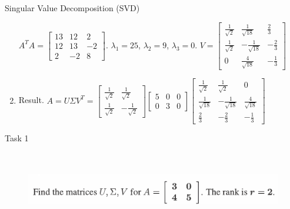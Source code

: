 \documentclass[aspectratio=169]{beamer}
\begin{document}
\begin{frame}[t]{Singular Value Decomposition (SVD)}
\begin{enumerate}
        $A^TA= \begin{bmatrix}
        13 & 12 & 2 \\
        12 & 13 & -2 \\ 
        2 & -2  & 8 
        \end{bmatrix}$. $\lambda_1 = 25$, $\lambda_2 = 9$, $\lambda_3 = 0$. $V = \begin{bmatrix}
            \frac{1}{\sqrt{2}} & \frac{1}{\sqrt{18}} & \frac{2}{3} \\
            \frac{1}{\sqrt{2}} & -\frac{1}{\sqrt{18}} & -\frac{2}{3}\\ 
            0 & \frac{4}{\sqrt{18}} & -\frac{1}{3}  
        \end{bmatrix}$
    \item Result. $A=U\Sigma V^T=\begin{bmatrix}
        \frac{1}{\sqrt{2}} & \frac{1}{\sqrt{2}}\\ 
        \frac{1}{\sqrt{2}} &  -\frac{1}{\sqrt{2}}
    \end{bmatrix}\begin{bmatrix}
    5 & 0 & 0 \\
    0 & 3 & 0 
    \end{bmatrix}\begin{bmatrix}
        \frac{1}{\sqrt{2}} & \frac{1}{\sqrt{2}} & 0 \\
        \frac{1}{\sqrt{18}} & -\frac{1}{\sqrt{18}} & \frac{4}{\sqrt{18}}\\ 
        \frac{2}{3} & -\frac{2}{3} & -\frac{1}{3}  
    \end{bmatrix}$
    \end{enumerate}
\end{frame}

\begin{frame}[t]{Task 1}
    \framesubtitle{}
    \vspace{-0.5cm}
    \begin{figure}[H]
        \centering\includegraphics[height=3cm,width=1\textwidth,keepaspectratio]{1.png}
        \label{fig:1.png}
    \end{figure}
\end{frame}
\end{document}
